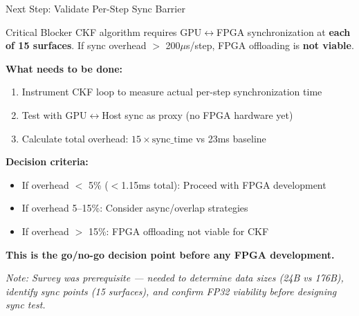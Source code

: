 \documentclass[aspectratio=169, table]{beamer}
\begin{document}
\begin{frame}{Next Step: Validate Per-Step Sync Barrier}
\begin{alertblock}{Critical Blocker}
CKF algorithm requires GPU$\leftrightarrow$FPGA synchronization at \textbf{each of 15 surfaces}. If sync overhead $>$ 200$\mu$s/step, FPGA offloading is \textbf{not viable}.
\end{alertblock}

\vspace{0.5em}
\textbf{What needs to be done:}
\begin{enumerate}
    \item Instrument CKF loop to measure actual per-step synchronization time
    \item Test with GPU$\leftrightarrow$Host sync as proxy (no FPGA hardware yet)
    \item Calculate total overhead: $15 \times \text{sync\_time}$ vs 23ms baseline
\end{enumerate}

\vspace{0.5em}
\textbf{Decision criteria:}
\begin{itemize}
    \item If overhead $<$ 5\% ($<$1.15ms total): \textcolor{acadgreen}{Proceed with FPGA development}
    \item If overhead 5--15\%: Consider async/overlap strategies
    \item If overhead $>$ 15\%: \textcolor{acadred}{FPGA offloading not viable for CKF}
\end{itemize}

\vspace{0.5em}
\textbf{This is the go/no-go decision point before any FPGA development.}

\vspace{0.3em}
{\small \textit{Note: Survey was prerequisite --- needed to determine data sizes (24B vs 176B), identify sync points (15 surfaces), and confirm FP32 viability before designing sync test.}}
\end{frame}
\end{document}
